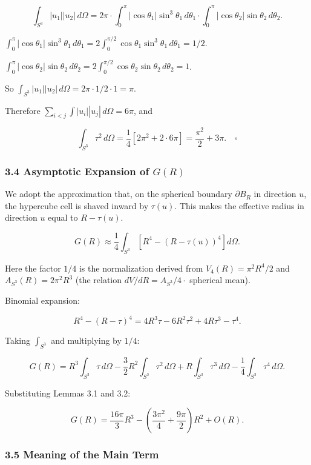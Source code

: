 \documentclass[
]{article}
\begin{document}
\[\int_{S^3} |u_1||u_2| \, d\Omega = 2\pi \cdot \int_0^\pi |\cos\theta_1| \sin^3\theta_1 \, d\theta_1 \cdot \int_0^\pi |\cos\theta_2| \sin\theta_2 \, d\theta_2.\]

\(\int_0^\pi |\cos\theta_1| \sin^3\theta_1 \, d\theta_1 = 2 \int_0^{\pi/2} \cos\theta_1 \sin^3\theta_1 \, d\theta_1 = 1/2\).

\(\int_0^\pi |\cos\theta_2| \sin\theta_2 \, d\theta_2 = 2 \int_0^{\pi/2} \cos\theta_2 \sin\theta_2 \, d\theta_2 = 1\).

So \(\int_{S^3} |u_1||u_2| \, d\Omega = 2\pi \cdot 1/2 \cdot 1 = \pi\).

Therefore \(\sum_{i<j} \int |u_i||u_j| \, d\Omega = 6\pi\), and

\[\int_{S^3} \tau^2 \, d\Omega = \frac{1}{4}[2\pi^2 + 2 \cdot 6\pi] = \frac{\pi^2}{2} + 3\pi. \quad \square\]

\subsubsection{\texorpdfstring{3.4 Asymptotic Expansion of
\(G(R)\)}{3.4 Asymptotic Expansion of G(R)}}\label{asymptotic-expansion-of-gr-1}

We adopt the approximation that, on the spherical boundary
\(\partial B_R\) in direction \(u\), the hypercube cell is shaved inward
by \(\tau(u)\). This makes the effective radius in direction \(u\) equal
to \(R - \tau(u)\).

\[G(R) \approx \frac{1}{4}\int_{S^3}\left[R^4 - (R - \tau(u))^4\right] d\Omega. \tag{3.3}\]

Here the factor \(1/4\) is the normalization derived from
\(V_4(R) = \pi^2 R^4/2\) and \(A_{S^3}(R) = 2\pi^2 R^3\) (the relation
\(dV/dR = A_{S^3}/4 \cdot\) spherical mean).

Binomial expansion:

\[R^4 - (R - \tau)^4 = 4R^3 \tau - 6R^2 \tau^2 + 4R \tau^3 - \tau^4.\]

Taking \(\int_{S^3}\) and multiplying by \(1/4\):

\[G(R) = R^3 \int_{S^3}\tau \, d\Omega - \frac{3}{2}R^2 \int_{S^3}\tau^2 \, d\Omega + R \int_{S^3}\tau^3 \, d\Omega - \frac{1}{4}\int_{S^3}\tau^4 \, d\Omega.\]

Substituting Lemmas 3.1 and 3.2:

\[\boxed{G(R) = \frac{16\pi}{3}R^3 - \left(\frac{3\pi^2}{4} + \frac{9\pi}{2}\right)R^2 + O(R).} \tag{3.4}\]

\subsubsection{3.5 Meaning of the Main
Term}\label{meaning-of-the-main-term}
\end{document}
